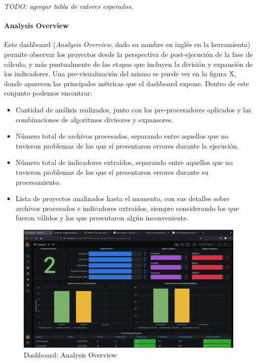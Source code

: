 \textit{TODO: agregar tabla de valores esperados.}

\paragraph{Analysis Overview}
Este dashboard (\textit{Analysis Overview}, dado su nombre en inglés en la herramienta)
permite observar los proyectos desde la perspectiva de post-ejecución de la fase
de cálculo, y más puntualmente de las etapas que incluyen la división y expansión
de los indicadores.
Una pre-visualización del mismo se puede ver en la figura X, donde aparecen las
principales métricas que el dashboard expone.
Dentro de este conjunto podemos encontrar:

\begin{itemize}
  \item Cantidad de análisis realizados, junto con los pre-procesadores aplicados y las
  combinaciones de algoritmos divisores y expansores.
  \item Número total de archivos procesados, separando entre aquellos que no tuvieron
  problemas de los que sí presentaron errores durante la ejecución.
  \item Número total de indicadores extraídos, separando entre aquellos que no tuvieron
  problemas de los que sí presentaron errores durante su procesamiento.
  \item Lista de proyectos analizados hasta el momento, con sus detalles sobre archivos
  procesados e indicadores extraídos, siempre considerando los que fueron válidos y los
  que presentaron algún inconveniente.
\end{itemize}

\begin{figure}[H]
  \includegraphics[width=12cm]{implementation/dashboard_analysis_overview.png}
  \centering
  \caption{Dashboard: Analysis Overview}
\end{figure}

